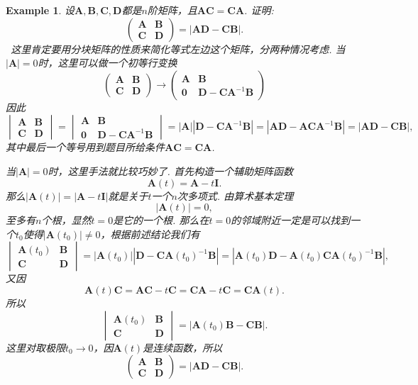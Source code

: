 \documentclass{article}
\newtheorem{example}[theorem]{Example}
\newcommand{\hints}{{\color{blue} \text{hints}}}
\newcommand{\mbf}[1]{\bm{#1}}
\begin{document}
\begin{example}
\rm 设$\mbf{A},\mbf{B},\mbf{C},\mbf{D}$都是$n$阶矩阵，且$\mbf{A}\mbf{C} = \mbf{C}\mbf{A}$. 证明:
$$
\begin{pmatrix}
\mbf{A} & \mbf{B} \\
\mbf{C} & \mbf{D}
\end{pmatrix} = |\mbf{AD} - \mbf{CB}|. 
$$
\hints\ 这里肯定要用分块矩阵的性质来简化等式左边这个矩阵，分两种情况考虑. 当$|\mbf{A}| = 0$时，这里可以做一个初等行变换
$$
\begin{pmatrix}
\mbf{A} & \mbf{B} \\
\mbf{C} & \mbf{D}
\end{pmatrix} \to 
\begin{pmatrix}
\mbf{A} & \mbf{B} \\
\mbf{0} & \mbf{D}-\mbf{C}\mbf{A}^{-1}\mbf{B} 
\end{pmatrix}
$$
因此
$$
\begin{vmatrix}
\mbf{A} & \mbf{B} \\
\mbf{C} & \mbf{D}
\end{vmatrix} = \begin{vmatrix}
\mbf{A} & \mbf{B} \\
\mbf{0} & \mbf{D}-\mbf{C}\mbf{A}^{-1}\mbf{B} 
\end{vmatrix} =|\mbf{A}||\mbf{D}-\mbf{C}\mbf{A}^{-1}\mbf{B}|=|\mbf{AD}-\mbf{AC}\mbf{A}^{-1}\mbf{B}| = |\mbf{AD}-\mbf{CB}|,
$$
其中最后一个等号用到题目所给条件$\mbf{A}\mbf{C} = \mbf{C}\mbf{A}$. 

当$|\mbf{A}| = 0$时，这里手法就比较巧妙了. 首先构造一个辅助矩阵函数
$$
\mbf{A}(t) = \mbf{A}-t\mbf{I}.
$$
那么$|\mbf{A}(t)| = |\mbf{A}-t\mbf{I}|$就是关于$t$一个$n$次多项式. 由算术基本定理
$$
|\mbf{A}(t)| = 0,
$$
至多有$n$个根，显然$t = 0$是它的一个根. 那么在$t = 0$的邻域附近一定是可以找到一个$t_0$使得$|\mbf{A}(t_0)| \neq 0$，根据前述结论我们有
$$
\begin{vmatrix}
\mbf{A}(t_0) & \mbf{B} \\
\mbf{C} & \mbf{D}
\end{vmatrix} = |\mbf{A}(t_0)||\mbf{D}-\mbf{C}\mbf{A}(t_0)^{-1}\mbf{B}|=|\mbf{A}(t_0)\mbf{D}-\mbf{A}(t_0)\mbf{C}\mbf{A}(t_0)^{-1}\mbf{B}|,
$$
又因
$$
\mbf{A}(t)\mbf{C} = \mbf{AC} - t\mbf{C} = \mbf{CA}-t\mbf{C} = \mbf{C}\mbf{A}(t). 
$$
所以
$$
\begin{vmatrix}
\mbf{A}(t_0) & \mbf{B} \\
\mbf{C} & \mbf{D}
\end{vmatrix}  = |\mbf{A}(t_0)\mbf{B}- \mbf{C}\mbf{B}|.
$$
这里对取极限$t_0 \to 0$，因$\mbf{A}(t)$是连续函数，所以
$$
\begin{pmatrix}
\mbf{A} & \mbf{B} \\
\mbf{C} & \mbf{D}
\end{pmatrix} = |\mbf{AD} - \mbf{CB}|. 
$$
\end{example}
\end{document}
